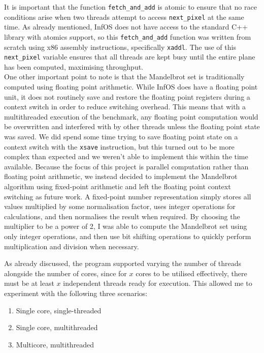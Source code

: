\documentclass[bsc,frontabs,singlespacing,parskip,deptreport]{infthesis}     %
\begin{document}
It is important that the function \verb|fetch_and_add| is atomic to ensure that no race conditions arise when two threads attempt to access \verb|next_pixel| at the same time. As already mentioned, InfOS does not have access to the standard C++ library with atomics support, so this \verb|fetch_and_add| function was written from scratch using x86 assembly instructions, specifically \verb|xaddl|. The use of this \verb|next_pixel| variable ensures that all threads are kept busy until the entire plane has been computed, maximising throughput. \\

One other important point to note is that the Mandelbrot set is traditionally computed using floating point arithmetic. While InfOS does have a floating point unit, it does not routinely save and restore the floating point registers during a context switch in order to reduce switching overhead. This means that with a multithreaded execution of the benchmark, any floating point computation would be overwritten and interfered with by other threads unless the floating point state was saved. We did spend some time trying to save floating point state on a context switch with the \verb|xsave| instruction, but this turned out to be more complex than expected and we weren't able to implement this within the time available. Because the focus of this project is parallel computation rather than floating point arithmetic, we instead decided to implement the Mandelbrot algorithm using fixed-point arithmetic and left the floating point context switching as future work. A fixed-point number representation simply stores all values multiplied by some normalisation factor, uses integer operations for calculations, and then normalises the result when required. By choosing the multiplier to be a power of 2, I was able to compute the Mandelbrot set using only integer operations, and then use bit shifting operations to quickly perform multiplication and division when necessary.

As already discussed, the program supported varying the number of threads alongside the number of cores, since for $x$ cores to be utilised effectively, there must be at least $x$ independent threads ready for execution. This allowed me to experiment with the following three scenarios:

\begin{enumerate}
    \item Single core, single-threaded 
    \item Single core, multithreaded 
    \item Multicore, multithreaded
\end{enumerate}
\end{document}
